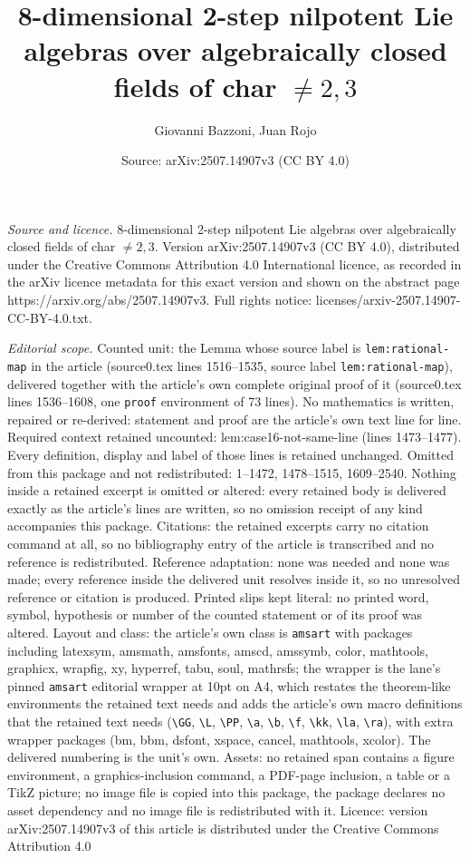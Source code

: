 \documentclass[10pt,a4paper]{amsart}
\title[8-dimensional 2-step nilpotent Lie algebras over algebraical]{8-dimensional 2-step nilpotent Lie algebras over algebraically closed fields of char $\ne 2, 3$}
\author{Giovanni Bazzoni, Juan Rojo}
\date{Source: arXiv:2507.14907v3 (CC BY 4.0)}
\begin{document}
\maketitle

\noindent\emph{Source and licence.} 8-dimensional 2-step nilpotent Lie algebras over algebraically closed fields of char $\ne 2, 3$. Version arXiv:2507.14907v3 (CC BY 4.0), distributed under the Creative Commons Attribution 4.0 International licence, as recorded in the arXiv licence metadata for this exact version and shown on the abstract page https://arxiv.org/abs/2507.14907v3. Full rights notice: licenses/arxiv-2507.14907-CC-BY-4.0.txt.\par\smallskip

\noindent\textit{Editorial scope.} Counted unit: the Lemma whose source label is \texttt{lem:rational-map} in the article (source0.tex lines 1516--1535, source label \texttt{lem:rational-map}), delivered together with the article's own complete original proof of it (source0.tex lines 1536--1608, one \texttt{proof} environment of 73 lines). No mathematics is written, repaired or re-derived: statement and proof are the article's own text line for line. Required context retained uncounted: lem:case16-not-same-line (lines 1473--1477). Every definition, display and label of those lines is retained unchanged. Omitted from this package and not redistributed: 1--1472, 1478--1515, 1609--2540. Nothing inside a retained excerpt is omitted or altered: every retained body is delivered exactly as the article's lines are written, so no omission receipt of any kind accompanies this package. Citations: the retained excerpts carry no citation command at all, so no bibliography entry of the article is transcribed and no reference is redistributed. Reference adaptation: none was needed and none was made; every reference inside the delivered unit resolves inside it, so no unresolved reference or citation is produced. Printed slips kept literal: no printed word, symbol, hypothesis or number of the counted statement or of its proof was altered. Layout and class: the article's own class is \texttt{amsart} with packages including latexsym, amsmath, amsfonts, amscd, amssymb, color, mathtools, graphicx, wrapfig, xy, hyperref, tabu, soul, mathrsfs; the wrapper is the lane's pinned \texttt{amsart} editorial wrapper at 10pt on A4, which restates the theorem-like environments the retained text needs and adds the article's own macro definitions that the retained text needs (\texttt{\textbackslash GG}, \texttt{\textbackslash L}, \texttt{\textbackslash PP}, \texttt{\textbackslash a}, \texttt{\textbackslash b}, \texttt{\textbackslash f}, \texttt{\textbackslash kk}, \texttt{\textbackslash la}, \texttt{\textbackslash ra}), with extra wrapper packages (bm, bbm, dsfont, xspace, cancel, mathtools, xcolor). The delivered numbering is the unit's own. Assets: no retained span contains a figure environment, a graphics-inclusion command, a PDF-page inclusion, a table or a TikZ picture; no image file is copied into this package, the package declares no asset dependency and no image file is redistributed with it. Licence: version arXiv:2507.14907v3 of this article is distributed under the Creative Commons Attribution 4.0 
\end{document}
